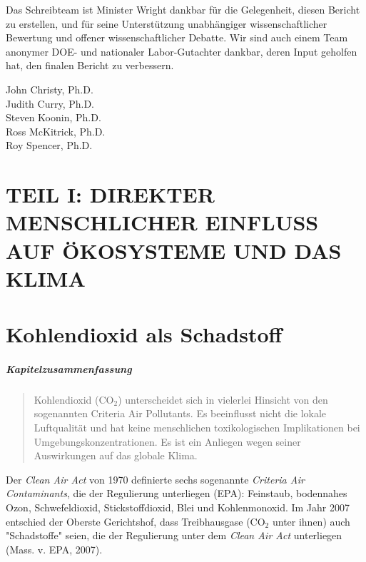 \documentclass[12pt,paper=a4,DIV=12,parskip=never,chapterprefix=false,headings=standardclasses]{scrreprt}
\begin{document}
Das Schreibteam ist Minister Wright dankbar für die Gelegenheit, diesen Bericht zu erstellen, und für seine Unterstützung unabhängiger wissenschaftlicher Bewertung und offener wissenschaftlicher Debatte. Wir sind auch einem Team anonymer DOE- und nationaler Labor-Gutachter dankbar, deren Input geholfen hat, den finalen Bericht zu verbessern.
\vspace{2ex}

\noindent
John Christy, Ph.D.\\[1em]
Judith Curry, Ph.D.\\[1em]
Steven Koonin, Ph.D.\\[1em]
Ross McKitrick, Ph.D.\\[1em]
Roy Spencer, Ph.D.

\cleardoublepage
\chapter*{TEIL I: DIREKTER MENSCHLICHER EINFLUSS AUF ÖKOSYSTEME UND DAS KLIMA}
\cleardoublepage
{}
\chapter{Kohlendioxid als Schadstoff}
\paragraph{Kapitelzusammenfassung}
\begin{quote}
Kohlendioxid (CO$_2$) unterscheidet sich in vielerlei Hinsicht von den sogenannten Criteria Air Pollutants. Es beeinflusst nicht die lokale Luftqualität und hat keine menschlichen toxikologischen Implikationen bei Umgebungskonzentrationen. Es ist ein Anliegen wegen seiner Auswirkungen auf das globale Klima.
\end{quote}

Der \emph{Clean Air Act} von 1970 definierte sechs sogenannte \emph{Criteria Air Contaminants}, die der Regulierung unterliegen (EPA): Feinstaub, bodennahes Ozon, Schwefeldioxid, Stickstoffdioxid, Blei und Kohlenmonoxid. Im Jahr 2007 entschied der Oberste Gerichtshof, dass Treibhausgase (CO$_2$ unter ihnen) auch "Schadstoffe" seien, die der Regulierung unter dem \emph{Clean Air Act} unterliegen (Mass. v. EPA, 2007).
\end{document}
